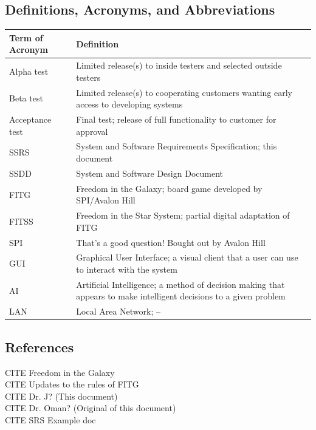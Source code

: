 \documentclass[twoside,letterpaper]{article}
\begin{document}
\subsection{Definitions, Acronyms, and Abbreviations}

\begin{minipage}{\linewidth}
\centering
\begin{tabularx}{\textwidth}{lX}\toprule[1.5pt] %

\bf Term of Acronym & \bf Definition\\ \midrule[1.0pt]

Alpha test & Limited release(s) to inside testers and selected outside testers\\
Beta test & Limited release(s) to cooperating customers wanting early access to developing systems\\
Acceptance test & Final test; release of full functionality to customer for approval\\
SSRS & System and Software Requirements Specification; this document\\
SSDD & System and Software Design Document\\
FITG & Freedom in the Galaxy; board game developed by SPI/Avalon Hill\\
FITSS & Freedom in the Star System; partial digital adaptation of FITG\\
SPI & That's a good question! Bought out by Avalon Hill\\
GUI & Graphical User Interface; a visual client that a user can use to interact with the system\\
AI & Artificial Intelligence; a method of decision making that appears to make intelligent decisions to a given problem\\
LAN & Local Area Network; --\\

\bottomrule[1.5pt]
\end{tabularx}
\end{minipage}


\subsection{References}
CITE Freedom in the Galaxy \\
CITE Updates to the rules of FITG \\
CITE Dr. J? (This document)\\
CITE Dr. Oman? (Original of this document)\\
CITE SRS Example doc %
\end{document}
